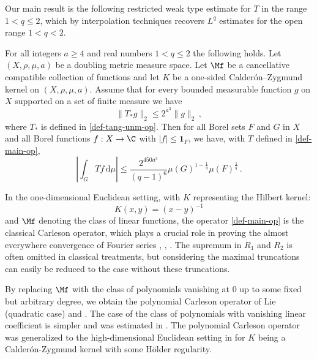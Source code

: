 Our main result is the following restricted weak type estimate for $T$ in the range $1<q\le 2$, which by interpolation techniques recovers $L^q$ estimates for the open range
$1<q<2$.
\begin{theorem}
\label{metric-space-Carleson}
\leanok
{}
    For all integers $a \ge 4$ and real numbers $1<q\le 2$
    the following holds.
    Let $(X,\rho,\mu,a)$ be a doubling metric measure space. Let $\Mf$ be a
    cancellative compatible collection of functions and let $K$ be a one-sided Calder\'on--Zygmund kernel on $(X,\rho,\mu,a)$. Assume that for every bounded measurable function $g$ on $X$ supported on a set of finite measure we have
    \begin{equation}\label{nontanbound}
        \|T_{*}g\|_{2} \leq 2^{a^3} \|g\|_2\,,
    \end{equation}
    where $T_{*}$ is defined in
\eqref{def-tang-unm-op}.
    Then for all Borel sets $F$ and $G$ in $X$ and
    all Borel functions $f:X\to \C$ with
    $|f|\le \mathbf{1}_F$, we have, with $T$ defined in \eqref{def-main-op},
    \begin{equation}
    \label{resweak}
        \left|\int_{G} T f \, \mathrm{d}\mu\right| \leq \frac{2^{450a^3}}{(q-1)^6} \mu(G)^{1-\frac{1}{q}} \mu(F)^{\frac{1}{q}}\, .
        \end{equation}
\end{theorem}

In the one-dimensional Euclidean setting, with $K$ representing the Hilbert kernel:
\begin{equation*}
K(x,y)=(x-y)^{-1}
\end{equation*}
and $\Mf$ denoting the class of linear functions, the operator \eqref{def-main-op} is the classical Carleson operator, which plays a crucial role in proving the almost everywhere convergence of Fourier series \cite{carleson}, \cite{fefferman}, \cite{lacey-thiele}. The supremum in $R_1$ and $R_2$ is often omitted in classical treatments, but considering the maximal truncations can easily be reduced to the case without these truncations.

By replacing $\Mf$ with the class of polynomials vanishing at $0$ up to some fixed but arbitrary degree, we obtain the polynomial Carleson operator of Lie \cite{lie-quadratic} (quadratic case) and \cite{lie-polynomial}. The case of the class of polynomials with vanishing linear coefficient is simpler and was estimated in \cite{stein-wainger}. The polynomial Carleson operator was generalized to the high-dimensional Euclidean setting in \cite{zk-polynomial} for $K$ being a Calder\'on-Zygmund kernel with some H\"older regularity.

